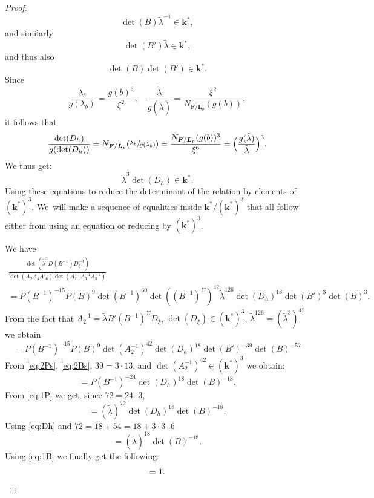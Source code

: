 \documentclass[10pt,a4paper]{amsart}
\theoremstyle{definition}
\newcommand{\kk}{{\boldsymbol{k}}}
\newcommand{\FF}{{\boldsymbol{F}}}
\newcommand{\LL}{{\boldsymbol{L}}}
\begin{document}
\begin{proof}
\begin{equation} \label{eq:1B}
\det(B) \tilde \lambda^{-1} \in \kk^*,
\end{equation}
and similarly\vspace*{-3pt}
\[
\det(B') \tilde \lambda \in \kk^*,
\]
and thus also\vspace*{-3pt}
\begin{equation} \label{eq:2Bs}
\det(B)\det(B') \in \kk^*.
\end{equation}
Since\vspace*{-3pt}
\[
\frac{\lambda_b}{g(\lambda_b)} = \frac{g(b)^3}{\xi^2}, \quad\frac{\tilde \lambda}{g(\tilde \lambda)} = \frac{\xi^2}{N_{\FF/\LL_p}(g(b))},
\]
it follows that\vspace*{-3pt}
\[
\frac{\det(D_h)}{g(\det(D_h))} = N_{\FF/\LL_p}(\sfrac{\lambda_b}{g(\lambda_b)}) = \frac{N_{\FF/\LL_p}(g(b))^3}{\xi^6} =\Bigl(\frac{g(\tilde \lambda)}{\tilde \lambda}\Bigr)^3.
\]
We thus get:\vspace*{-3pt}
\begin{equation} \label{eq:Dh}
\tilde \lambda^3 \det(D_h) \in \kk^*.
\end{equation}
Using these equations to reduce the determinant of the relation by elements of $(\kk^*)^3$. We~will make a sequence of equalities inside $\kk^*/(\kk^*)^3$ that all follow either from using an equation or reducing by $(\kk^*)^3$.

We have\vspace*{-3pt}
\begin{multline*}
\frac{\det(\tilde \lambda^3 D(B^{-1})D_{\xi}^{-3})}{\det(A_2A_4A'_6)\det(A_1^{-1}A_3^{-1}A_5^{-1})}
\\
= P(B^{-1})^{-15} P(B)^9 \det(B^{-1})^{60} \det((B^{-1})^{\Sigma})^{42} \tilde \lambda^{126} \det(D_h)^{18}\det(B')^3\det(B)^3.
\end{multline*}
From the fact that $A_2^{-1} = \tilde \lambda B' (B^{-1})^{\Sigma} D_{\xi}$, $\det(D_{\xi}) \in (\kk^*)^3$, $\tilde \lambda^{126} = (\tilde \lambda ^3)^{ 42}$ we obtain
\[= P(B^{-1})^{-15} P(B)^9 \det(A_2^{-1})^{42} \det(D_h)^{18}\det(B')^{-39}\det(B)^{-57}
\]
From \eqref{eq:2Ps}, \eqref{eq:2Bs}, $39=3 \cdot 13$, and $ \det(A_2^{-1})^{42} \in (\kk^*)^3$ we obtain:\vspace*{-3pt}
\[
= P(B^{-1})^{-24} \det(D_h)^{18}\det(B)^{-18}.
\]
From \eqref{eq:1P} we get, since $72 = 24 \cdot 3$,\vspace*{-3pt}
\[
= (\tilde \lambda)^{72} \det(D_h)^{18}\det(B)^{-18}.
\]
Using \eqref{eq:Dh} and $72 = 18 + 54 = 18 + 3 \cdot 3 \cdot 6$
\[
= (\tilde \lambda)^{18} \det(B)^{-18}.
\]
Using \eqref{eq:1B} we finally get the following:
\[
= 1.\qedhere
\]
\end{proof}
\end{document}

